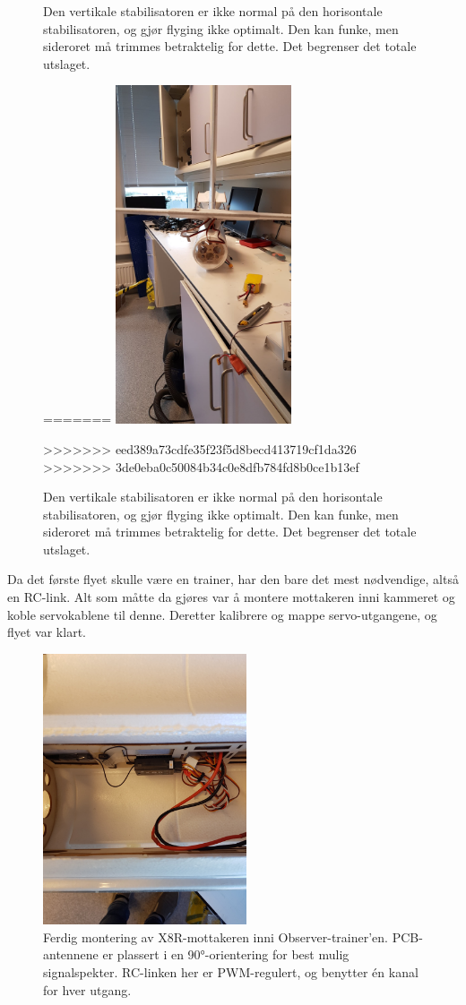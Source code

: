 \documentclass[12pt, a4paper]{article}
\begin{document}
\begin{figure}[ht]
	\caption{Den vertikale stabilisatoren er ikke normal på den horisontale stabilisatoren, og gjør flyging ikke optimalt. Den kan funke, men sideroret må trimmes betraktelig for dette. Det begrenser det totale utslaget.}
=======
	\includegraphics[width = .5\textwidth, height = 10cm]{bilder/skjev_halefinne.jpg}
	\caption[Skjev stabilisator]{Den vertikale stabilisatoren er ikke normal på den horisontale stabilisatoren, og gjør flyging ikke optimalt. Den kan funke, men sideroret må trimmes betraktelig for dette. Det begrenser det totale utslaget.}
>>>>>>> eed389a73cdfe35f23f5d8becd413719cf1da326
>>>>>>> 3de0eba0c50084b34c0e8dfb784fd8b0ce1b13ef
\end{figure}

Da det første flyet skulle være en trainer, har den bare det mest nødvendige, altså en RC-link. Alt som måtte da gjøres var å montere mottakeren inni kammeret og koble servokablene til denne. Deretter kalibrere og mappe servo-utgangene, og flyet var klart.

\begin{figure}[ht]
	\centering
	\includegraphics[height=8cm, width = .6\textwidth]{bilder/mottakermontering.jpg}
	\caption[Mottaker-montering]{Ferdig montering av X8R-mottakeren inni Observer-trainer'en. PCB-antennene er plassert i en \ang{90}-orientering for best mulig signalspekter. RC-linken her er PWM-regulert, og benytter én kanal for hver utgang.}
\end{figure}
\newpage
\end{document}
